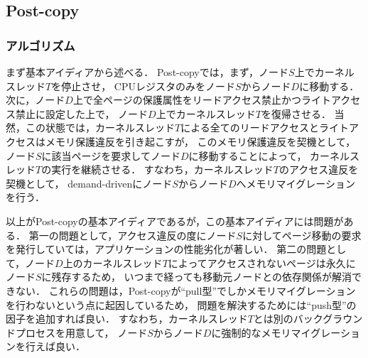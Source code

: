 \documentclass[10pt]{jsarticle}
\begin{document}
\subsection{Post-copy}

\subsubsection{アルゴリズム}

まず基本アイディアから述べる．
Post-copyでは，まず，ノード$S$上でカーネルスレッド$T$を停止させ，
CPUレジスタのみをノード$S$からノード$D$に移動する．
次に，ノード$D$上で全ページの保護属性をリードアクセス禁止かつライトアクセス禁止に設定した上で，
ノード$D$上でカーネルスレッド$T$を復帰させる．
当然，この状態では，カーネルスレッド$T$による全てのリードアクセスとライトアクセスはメモリ保護違反を引き起こすが，
このメモリ保護違反を契機として，ノード$S$に該当ページを要求してノード$D$に移動することによって，
カーネルスレッド$T$の実行を継続させる．
すなわち，カーネルスレッド$T$のアクセス違反を契機として，
demand-drivenにノード$S$からノード$D$へメモリマイグレーションを行う．

以上がPost-copyの基本アイディアであるが，この基本アイディアには問題がある．
第一の問題として，アクセス違反の度にノード$S$に対してページ移動の要求を発行していては，アプリケーションの性能劣化が著しい．
第二の問題として，ノード$D$上のカーネルスレッド$T$によってアクセスされないページは永久にノード$S$に残存するため，
いつまで経っても移動元ノードとの依存関係が解消できない．
これらの問題は，Post-copyが``pull型''でしかメモリマイグレーションを行わないという点に起因しているため，
問題を解決するためには``push型''の因子を追加すれば良い．
すなわち，カーネルスレッド$T$とは別のバックグラウンドプロセスを用意して，
ノード$S$からノード$D$に強制的なメモリマイグレーションを行えば良い．
\end{document}
